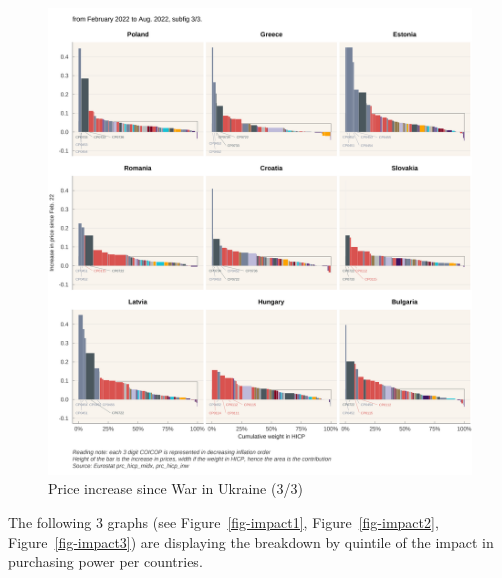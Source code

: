 \documentclass[
  9pt,
  a4paper,
  numbers=noendperiod,
  DIV=12]{scrartcl}
\begin{document}
\begin{figure}[htb]

\caption{\label{fig-priceinc3}Price increase since War in Ukraine (3/3)}

{\centering \includegraphics[width=1\textwidth,height=\textheight]{SIWU_brief_files/figure-pdf/fig-priceinc3-1.png}

}

\end{figure}

\FloatBarrier

The following 3 graphs (see Figure~\ref{fig-impact1},
Figure~\ref{fig-impact2}, Figure~\ref{fig-impact3}) are displaying the
breakdown by quintile of the impact in purchasing power per countries.
\end{document}
